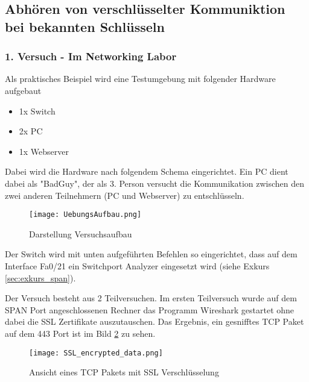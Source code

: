 	\subsection{Abhören von verschlüsselter Kommuniktion bei bekannten Schlüsseln}
	\subsubsection{1. Versuch - Im Networking Labor}
	Als praktisches Beispiel wird eine Testumgebung mit folgender Hardware aufgebaut
	\begin{itemize}
		\item 1x Switch
		\item 2x PC
		\item 1x Webserver
	\end{itemize}
	Dabei wird die Hardware nach folgendem Schema eingerichtet. Ein PC dient dabei als "BadGuy", der als 3. Person versucht
	die Kommunikation zwischen den zwei anderen Teilnehmern (PC und Webserver) zu entschlüsseln.
	\begin{figure}[H]
		\centering
		\texttt{[image: UebungsAufbau.png]}
		\caption{Darstellung Versuchsaufbau}
		\label{fig:versuchsaufbau}
	\end{figure}
	Der Switch wird mit unten aufgeführten Befehlen so eingerichtet, dass auf dem Interface Fa0/21 ein Switchport Analyzer eingesetzt wird (siehe Exkurs \ref{sec:exkurs_span}).
	
	Der Versuch besteht aus 2 Teilversuchen. Im ersten Teilversuch wurde auf dem SPAN Port angeschlossenen Rechner das Programm Wireshark gestartet ohne dabei die SSL Zertifikate auszutauschen. Das Ergebnis, ein gesnifftes TCP Paket auf dem 443 Port ist im Bild \ref{fig:ssl_encrypted_data} zu sehen.
	\begin{figure}[H]
		\centering
		\texttt{[image: SSL\_encrypted\_data.png]}
		\caption{Ansicht eines TCP Pakets mit SSL Verschlüsselung}
		\label{fig:ssl_encrypted_data}
	\end{figure}
	
